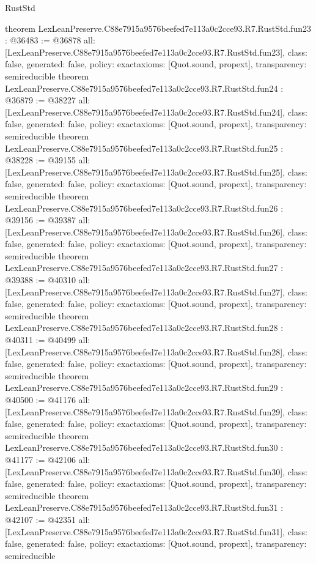 \begin{lexlean}{RustStd}
\begin{coremodule}
{}
theorem LexLeanPreserve.C88e7915a9576beefed7e113a0c2cce93.R7.RustStd.fun23 : @36483 := @36878 {
  all: [LexLeanPreserve.C88e7915a9576beefed7e113a0c2cce93.R7.RustStd.fun23],
  class: false,
  generated: false,
  policy: exact{axioms: [Quot.sound, propext]},
  transparency: semireducible
}
theorem LexLeanPreserve.C88e7915a9576beefed7e113a0c2cce93.R7.RustStd.fun24 : @36879 := @38227 {
  all: [LexLeanPreserve.C88e7915a9576beefed7e113a0c2cce93.R7.RustStd.fun24],
  class: false,
  generated: false,
  policy: exact{axioms: [Quot.sound, propext]},
  transparency: semireducible
}
theorem LexLeanPreserve.C88e7915a9576beefed7e113a0c2cce93.R7.RustStd.fun25 : @38228 := @39155 {
  all: [LexLeanPreserve.C88e7915a9576beefed7e113a0c2cce93.R7.RustStd.fun25],
  class: false,
  generated: false,
  policy: exact{axioms: [Quot.sound, propext]},
  transparency: semireducible
}
theorem LexLeanPreserve.C88e7915a9576beefed7e113a0c2cce93.R7.RustStd.fun26 : @39156 := @39387 {
  all: [LexLeanPreserve.C88e7915a9576beefed7e113a0c2cce93.R7.RustStd.fun26],
  class: false,
  generated: false,
  policy: exact{axioms: [Quot.sound, propext]},
  transparency: semireducible
}
theorem LexLeanPreserve.C88e7915a9576beefed7e113a0c2cce93.R7.RustStd.fun27 : @39388 := @40310 {
  all: [LexLeanPreserve.C88e7915a9576beefed7e113a0c2cce93.R7.RustStd.fun27],
  class: false,
  generated: false,
  policy: exact{axioms: [Quot.sound, propext]},
  transparency: semireducible
}
theorem LexLeanPreserve.C88e7915a9576beefed7e113a0c2cce93.R7.RustStd.fun28 : @40311 := @40499 {
  all: [LexLeanPreserve.C88e7915a9576beefed7e113a0c2cce93.R7.RustStd.fun28],
  class: false,
  generated: false,
  policy: exact{axioms: [Quot.sound, propext]},
  transparency: semireducible
}
theorem LexLeanPreserve.C88e7915a9576beefed7e113a0c2cce93.R7.RustStd.fun29 : @40500 := @41176 {
  all: [LexLeanPreserve.C88e7915a9576beefed7e113a0c2cce93.R7.RustStd.fun29],
  class: false,
  generated: false,
  policy: exact{axioms: [Quot.sound, propext]},
  transparency: semireducible
}
theorem LexLeanPreserve.C88e7915a9576beefed7e113a0c2cce93.R7.RustStd.fun30 : @41177 := @42106 {
  all: [LexLeanPreserve.C88e7915a9576beefed7e113a0c2cce93.R7.RustStd.fun30],
  class: false,
  generated: false,
  policy: exact{axioms: [Quot.sound, propext]},
  transparency: semireducible
}
theorem LexLeanPreserve.C88e7915a9576beefed7e113a0c2cce93.R7.RustStd.fun31 : @42107 := @42351 {
  all: [LexLeanPreserve.C88e7915a9576beefed7e113a0c2cce93.R7.RustStd.fun31],
  class: false,
  generated: false,
  policy: exact{axioms: [Quot.sound, propext]},
  transparency: semireducible
}
\end{coremodule}
\end{lexlean}
